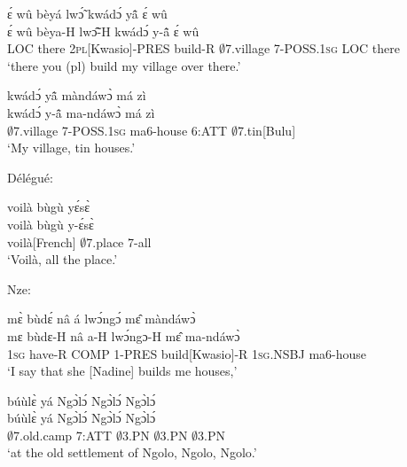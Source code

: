 \begin{exe} 
\exC\label{216}
  \glll ɛ́ wû bèyá lwɔ̃́ kwádɔ́ yã̂ ɛ́ wû \\
        ɛ́ wû bèya-H lwɔ̃̂-H kwádɔ́ y-ã̂ ɛ́ wû \\
         LOC there 2\textsc{pl}[Kwasio]-PRES build-R $\emptyset$7.village 7-POSS.1\textsc{sg} LOC there\\
    \trans `there you (pl) build my village over there.'
\end{exe}

\begin{exe} 
\exC\label{217} 
  \glll   kwádɔ́ yã̂ màndáwɔ̀ má zì \\
      kwádɔ́ y-ã̂ ma-ndáwɔ̀ má zì \\
         $\emptyset$7.village 7-POSS.1\textsc{sg} ma6-house 6:ATT $\emptyset$7.tin[Bulu] \\
    \trans `My village, tin houses.'
\end{exe}

\noindent Délégué:

\begin{exe} 
\exC\label{218} 
  \glll  voilà bùgù yɛ́sɛ̀ \\
        voilà bùgù y-ɛ́sɛ̀ \\
        voilà[French] $\emptyset$7.place 7-all  \\
    \trans `Voilà, all the place.'
\end{exe}

\noindent Nze:

\begin{exe} 
\exC\label{219} 
  \glll mɛ̀ bùdɛ́ nâ á lwɔ́ngɔ́ mɛ̂ màndáwɔ̀\\
        mɛ bùdɛ-H nâ a-H lwɔ́ngɔ-H mɛ̂ ma-ndáwɔ̀ \\
       1\textsc{sg} have-R COMP 1-PRES build[Kwasio]-R 1\textsc{sg}.NSBJ ma6-house   \\
    \trans `I say that she [Nadine] builds me houses,'
\end{exe}

\begin{exe} 
\exC\label{220} 
  \glll  búùlɛ̀ yá Ngɔ̀lɔ́ Ngɔ̀lɔ́ Ngɔ̀lɔ́ \\
          búùlɛ̀ yá Ngɔ̀lɔ́ Ngɔ̀lɔ́ Ngɔ̀lɔ́ \\
         $\emptyset$7.old.camp 7:ATT $\emptyset$3.PN $\emptyset$3.PN $\emptyset$3.PN \\
    \trans `at the old settlement of Ngolo, Ngolo, Ngolo.'
\end{exe}

